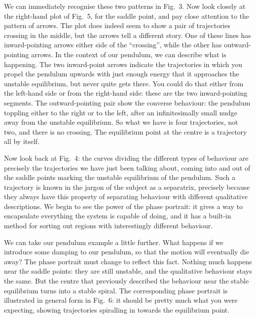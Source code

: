   We can immediately recognise these two patterns in Fig.\ 3. Now look closely 
  at the right-hand plot of Fig.\ 5, for the saddle point, and pay close 
  attention to the pattern of arrows. The plot does indeed seem to show a pair 
  of trajectories crossing in the middle, but the arrows tell a different 
  story. One of these lines has inward-pointing arrows either side of the 
  “crossing”, while the other has outward-pointing arrows. In the context of 
  our pendulum, we can describe what is happening. The two inward-point arrows 
  indicate the trajectories in which you propel the pendulum upwards with just 
  enough energy that it approaches the unstable equilibrium, but never quite 
  gets there. You could do that either from the left-hand side or from the 
  right-hand side: these are the two inward-pointing segments. The 
  outward-pointing pair show the converse behaviour: the pendulum toppling 
  either to the right or to the left, after an infinitesimally small nudge away 
  from the unstable equilibrium. So what we have is four trajectories, not two, 
  and there is no crossing. The equilibrium point at the centre is a trajectory 
  all by itself. 

  Now look back at Fig.\ 4: the curves dividing the different types of 
  behaviour are precisely the trajectories we have just been talking about, 
  coming into and out of the saddle points marking the unstable equilibrium of 
  the pendulum. Such a trajectory is known in the jargon of the subject as a 
  separatrix, precisely because they always have this property of separating 
  behaviour with different qualitative descriptions. We begin to see the power 
  of the phase portrait: it gives a way to encapsulate everything the system is 
  capable of doing, and it has a built-in method for sorting out regions with 
  interestingly different behaviour. 

  We can take our pendulum example a little further. What happens if we 
  introduce some damping to our pendulum, so that the motion will eventually 
  die away? The phase portrait must change to reflect this fact. Nothing much 
  happens near the saddle points: they are still unstable, and the qualitative 
  behaviour stays the same. But the centre that previously described the 
  behaviour near the stable equilibrium turns into a stable spiral. The 
  corresponding phase portrait is illustrated in general form in Fig.\ 6: it 
  should be pretty much what you were expecting, showing trajectories 
  spiralling in towards the equilibrium point. 

